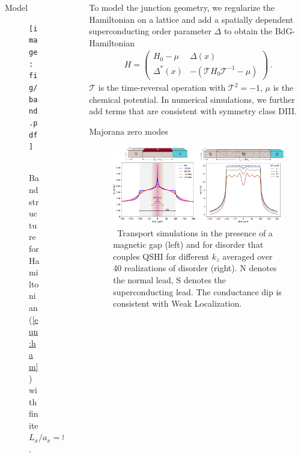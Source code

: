 \documentclass[final]{beamer}
\newlength{\sepwid}
\newlength{\onecolwid}
\begin{document}
\begin{frame}[t]
\begin{columns}[t]
\begin{column}{\onecolwid}
\begin{block}{Model}
\end{block}
\begin{figure}
	\texttt{[image: fig/band.pdf]}
	\caption{\sffamily \, Bandstructure for Hamiltonian (\ref{eqn:ham}) with finite
	$L_x/a_x=80$. }
\label{fig:band}
\end{figure}

\end{column} %

\begin{column}{\sepwid}\end{column} %

\begin{column}{\onecolwid} %
\rmfamily
\justify
To model the junction
geometry, we regularize the Hamiltonian on a lattice and add a spatially dependent superconducting order
parameter $\Delta$ to obtain the BdG-Hamiltonian
\begin{eqnarray*}
	H = \begin{pmatrix}
		H_0 -\mu& \Delta(x) \\
	\Delta^*(x) & -\left(\mathcal{T}H_0\mathcal{T}^{-1} -\mu\right)
\end{pmatrix} \,.
\end{eqnarray*}
$\mathcal{T}$ is the time-reversal operation with $\mathcal{T}^2=-1$, $\mu$ is
the chemical potential. In numerical simulations, we further add terms that are
consistent with symmetry class DIII.

\begin{block}{Majorana zero modes}

\begin{figure}
	\includegraphics[width=\linewidth]{fig/transport.pdf}
	\caption{\sffamily \, Transport simulations in the presence of a magnetic gap (left)
	and for disorder that couples QSHI for different $k_z$ averaged over 40
	realizations of disorder (right). N
	denotes the normal lead, S denotes the superconducting lead. The
conductance dip is consistent with Weak Localization.}
\label{fig:transport}
\end{figure}


\end{block}
\end{column}
\end{columns}
\end{frame}
\end{document}
